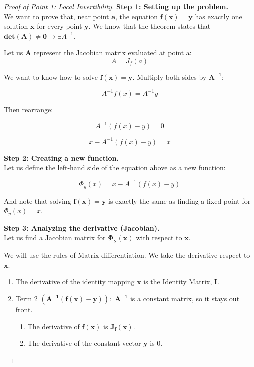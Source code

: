 \documentclass{article}
\begin{document}
\begin{proof}[Proof of Point 1: Local Invertibility]

\textbf{Step 1: Setting up the problem.} \\

We want to prove that, near point $\mathbf{a}$, the equation $\mathbf{f(x)=y}$ has exactly one solution $\mathbf{x}$ for every point $\mathbf{y}$. We know that the theorem states that $\mathbf{det(A) \ne 0} \rightarrow \exists A^{-1}$.

Let us $\mathbf{A}$ represent the Jacobian matrix evaluated at point a:
\[
    A = J_f(a)
\]

We want to know how to solve $\mathbf{f(x) = y}$. Multiply both sides by $\mathbf{A^{-1}}$:

\[
    A^{-1}f(x) = A^{-1}y
\]

Then rearrange:

\[
    A^{-1}(f(x) - y) = 0
\]

\[
    x - A^{-1}(f(x) - y) = x
\]


\textbf{Step 2: Creating a new function.} \\

Let us define the left-hand side of the equation above as a new function:

\[
\Phi_y(x) = x - A^{-1}(f(x) - y)
\]

And note that solving $\mathbf{f(x) = y}$ is exactly the same as finding a fixed point for $\Phi_y(x) = x$.

\textbf{Step 3: Analyzing the derivative (Jacobian).} \\

Let us find a Jacobian matrix for $\mathbf{\Phi_y(x)}$ with respect to $\mathbf{x}$.

We will use the rules of Matrix differentiation. We take the derivative respect to $\mathbf{x}$.

\begin{enumerate}
    \item The derivative of the identity mapping $\mathbf{x}$ is the Identity Matrix, $\mathbf{I}$.

    \item Term 2 $\mathbf{(A^{-1}(f(x) - y)):}$ $\mathbf{A^{-1}}$ is a constant matrix, so it stays out front.
        \begin{enumerate}
            \item The derivative of $\mathbf{f(x)}$ is $\mathbf{J_f(x)}$.
            \item The derivative of the constant vector $\mathbf{y}$ is 0.
        \end{enumerate}
\end{enumerate}


\end{proof}
\end{document}
